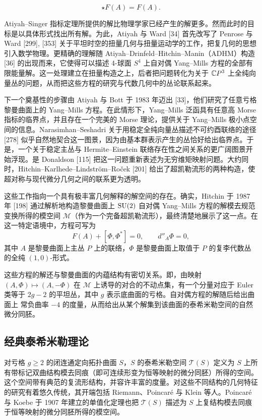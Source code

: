 
\[
\star F(A)=F(A).
\]

Atiyah--Singer 指标定理所提供的解比物理学家已经产生的解更多。然而此时的目标是以具体形式找出所有解。为此，Atiyah 与 Ward [34] 首先改写了 Penrose 与 Ward [299], [353] 关于平坦时空的扭量几何与扭量运动学的工作，把复几何的思想引入数学物理。更精确的理解随 Atiyah--Drinfeld--Hitchin--Manin（ADHM）构造 [36] 的出现而来，它使得可以描述 4-球面 $S^4$ 上自对偶 Yang--Mills 方程的全部有限能量解。这一处理建立在扭量构造之上，后者把问题转化为关于 $\mathbb{C} P^3$ 上全纯向量丛的问题，从而把这些方程的研究与代数几何中的丛论联系起来。

下一个奠基性的步骤由 Atiyah 与 Bott 于 1983 年迈出 [33]，他们研究了任意亏格黎曼曲面上的 Yang--Mills 方程。在此情形下，Yang--Mills 泛函具有任意高 Morse 指标的临界点，并且存在一个完美的 Morse 理论，提供关于 Yang--Mills 极小点空间的信息。Narasimhan--Seshadri 关于用稳定全纯向量丛描述不可约酉联络的途径 [278] 似乎自然地契合这一图景，因为由基本群表示产生的丛恰好给出临界点。于是，一个关于稳定主丛与 Hermite--Einstein 联络存在性之间关系的更广阔图景开始浮现。是 Donaldson [115] 把这一问题重新表述为无穷维矩映射问题。大约同时，Hitchin--Karlhede--Lindstr\"om--Ro\v{c}ek [201] 给出了超凯勒流形的两种构造，使超对称与现代微分几何之间的联系更为透明。

这些工作指向一个具有极丰富几何解释的解空间的存在。确实，Hitchin 于 1987 年 [198] 通过解析地构造黎曼曲面上 $\operatorname{SU}(2)$ 自对偶 Yang--Mills 方程的解模去规范变换所得的模空间 $\mathcal{M}$（作为一个完备超凯勒流形），最终清楚地展示了这一点。在这一特定语境中，方程可写为
\[
F(A)+[\Phi,\Phi^*]=0,\qquad d''_A\Phi=0,
\]
其中 $A$ 是黎曼曲面上主丛 $P$ 上的联络，$\Phi$ 是黎曼曲面上取值于 $P$ 的复李代数丛的全纯 $(1,0)$-形式。

这些方程的解还与黎曼曲面的内蕴结构有密切关系。即，由映射 $(A,\Phi)\mapsto(A,-\Phi)$ 在 $\mathcal{M}$ 上诱导的对合的不动点集，有一个分量对应于 Euler 类等于 $2g-2$ 的平坦丛，其中 $g$ 表示底曲面的亏格。自对偶方程的解随后给出曲面上
常负曲率 $-4$ 的度量，从而给出从某个解集到该曲面的泰希米勒空间的自然微分同胚。

\subsection*{经典泰希米勒理论}

对亏格 $g\ge 2$ 的闭连通定向拓扑曲面 $S$，$S$ 的泰希米勒空间 $\mathcal{T}(S)$ 定义为 $S$ 上所有带标记双曲结构模去同痕（即可连续形变为恒等映射的微分同胚）所得的空间。这个空间带有典范的复流形结构，并容许丰富的度量。对这些不同结构的几何特征的研究有着悠久传统，其开端包括 Riemann、Poincar\'e 与 Klein 等人。Poincar\'e 与 Koebe 于 1907 年建立的单值化定理也把 $\mathcal{T}(S)$ 描述为 $S$ 上复结构模去同痕于恒等映射的微分同胚所得的模空间。

